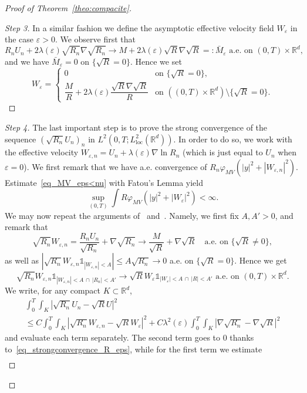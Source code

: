 \documentclass[AHL,Unicode,longabstracts]{cedram}
\newcommand*{\un}{\mathds{1}}
\newcommand*\R{\mathbb{R}}
\newcommand*{\loc}{\mathrm{loc}}
\newcommand*\<{\left\langle}
\renewcommand*\>{\right\rangle}
\renewcommand*\le{\leqslant}
\newcommand*\eps{\varepsilon}
\begin{document}
\begin{proof}[Proof of Theorem~\ref{theo:compacite}]
\begin{proof}[Step 3]
In a similar fashion we define the asymptotic effective velocity field $W_\eps$ in the case $\eps >0$. We observe first that
\[
R_n U_n + 2\lambda(\eps) \sqrt{R_n} \nabla \sqrt{R_n}
\to M + 2\lambda(\eps) \sqrt{R} \nabla \sqrt{R} =: \bar M_\eps
\text{ a.e. on } (0,T)\times \R^d,
\]
and we have $ \bar M_\eps = 0$ on $\{\sqrt{R}=0\}.$ Hence we set
\[
W_\eps =
\begin{cases}
0 & \text{on }\{\sqrt{R} = 0\},\\
\dfrac{M}{R} +2\lambda(\eps) \dfrac{ \sqrt{R} \nabla \sqrt{R} }{R}&
\text{on }\left((0,T) \times \mathbb R^d \right)\setminus \{\sqrt{R} = 0\}.
\end{cases}
\]
\let\qed\relax
\end{proof}

\begin{proof}[Step 4]
The last important step is to prove the strong convergence of the sequence $(\sqrt{R_n} U_n)_{n}$ in $L^2(0,T;L^2_{\loc}(\mathbb R^d)).$ In order to do so, we work with the effective velocity $ W_{\eps,n} = U_n + \lambda(\eps) \nabla \ln R_n$ (which is just equal to $U_n$ when $\eps = 0$). We first remark that we have a.e. convergence of ${R_n}\varphi_{MV}(|y|^2 + |W_{\eps,n}|^2)$. Estimate~\eqref{eq_MV_eps<nu} with Fatou's Lemma yield
\[
\sup_{(0,T)} \int R \varphi_{MV}(|y|^2 + |W_\eps|^2) < \infty.
\]
We may now repeat the arguments of~\cite[p.~445--446]{MelletVasseur} and~\cite{AS-comp}. Namely, we first fix $A,A' >0$, and remark that
\[
\sqrt{R_n} W_{\eps,n} = \frac{R_n U_n}{\sqrt{R_n}} + \nabla \sqrt{R_n}
\to \frac{M}{\sqrt{R}} + \nabla \sqrt{R} \quad
\text{a.e. on } \{ \sqrt R \neq 0 \},
\]
as well as $|\sqrt{R_n} W_{\eps,n} \un_{|W_{\eps,n}| < A } |
\le A \sqrt{R_n} \to 0 $ a.e. on $\{ \sqrt R = 0 \}$. Hence we get
\[
\sqrt{R_n} W_{\eps,n} \un_{|W_{\eps,n}| < A \, \cap \, |R_n| < A'} \rightarrow
\sqrt{R} W_{\eps} \un_{|W_{\eps}| < A \, \cap \, |R| < A'}
\text{ a.e. on $(0,T) \times\mathbb R^d$}.
\]
We write, for any compact $K \subset \R^d$,
\begin{multline*}
\int_{0}^T \int_K \left|\sqrt{R_n} U_n - \sqrt{R} U \right|^2 \\
\le C\int_{0}^T \int_K \left|\sqrt{R_n} W_{\eps,n} - \sqrt{R} W_{\eps} \right|^2 + C \lambda^2(\eps)\int_{0}^T \int_K \left|\nabla \sqrt{R_n} - \nabla \sqrt{R} \right|^2
\end{multline*}
and evaluate each term separately. The second term goes to $0$ thanks to~\eqref{eq_strongconvergence_R_eps}, while for the first term we estimate
\begin{multline}\label{eq:conv-RW}

\end{multline}
\end{proof}
\end{proof}
\end{document}
